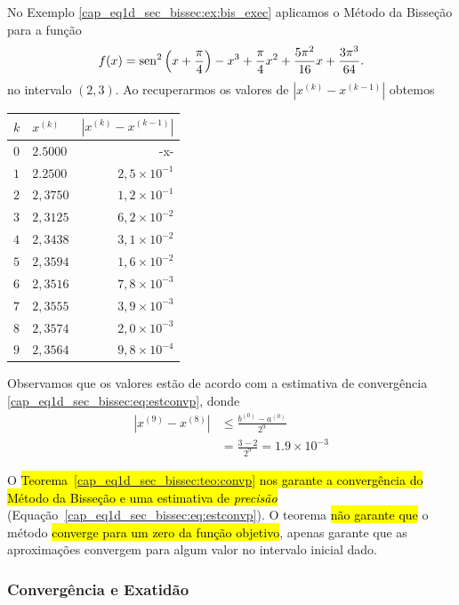 \begin{ex}\label{cap_eq1d_sec_bissec:ex:bis_convp}
  No Exemplo \ref{cap_eq1d_sec_bissec:ex:bis_exec} aplicamos o Método da Bisseção para a função
\begin{equation}
  f(x) = \operatorname{sen}^2\left(x+\frac{\pi}{4}\right) - x^3 + \frac{\pi}{4}x^2 + \frac{5\pi^2}{16}x + \frac{3\pi^3}{64}.
\end{equation}
no intervalo $(2, 3)$. Ao recuperarmos os valores de $\left|x^{(k)}-x^{(k-1)}\right|$ obtemos
\begin{center}
  \begin{tabular}[H]{l|l|r}
    $k$ & $x^{(k)}$ & $\left|x^{(k)}-x^{(k-1)}\right|$\\\hline
    $0$ & $2.5000$ & -x-\\
    $1$ & $2.2500$ & $2,5\times 10^{-1}$\\
    $2$ & $2,3750$ & $1,2\times 10^{-1}$\\
    $3$ & $2,3125$ & $6,2\times 10^{-2}$\\
    $4$ & $2,3438$ & $3,1\times 10^{-2}$\\
    $5$ & $2,3594$ & $1,6\times 10^{-2}$\\
    $6$ & $2,3516$ & $7,8\times 10^{-3}$\\
    $7$ & $2,3555$ & $3,9\times 10^{-3}$\\
    $8$ & $2,3574$ & $2,0\times 10^{-3}$\\
    $9$ & $2,3564$ & $9,8\times 10^{-4}$\\\hline
  \end{tabular}
\end{center}

Observamos que os valores estão de acordo com a estimativa de convergência \ref{cap_eq1d_sec_bissec:eq:estconvp}, donde
\begin{align}
  |x^{(9)}-x^{(8)}| &\leq \frac{b^{(0)}-a^{(0)}}{2^{9}}\\
                     &= \frac{3 - 2}{2^{9}} = 1.9\times 10^{-3}
\end{align}
\end{ex}

O \hl{Teorema~{\ref{cap_eq1d_sec_bissec:teo:convp}} nos garante a convergência do Método da Bisseção e uma estimativa de \emph{precisão}} (Equação~\ref{cap_eq1d_sec_bissec:eq:estconvp}). O teorema \hl{não garante que} o método \hl{converge para um zero da função objetivo}, apenas garante que as aproximações convergem para algum valor no intervalo inicial dado.

\subsubsection{Convergência e Exatidão}

